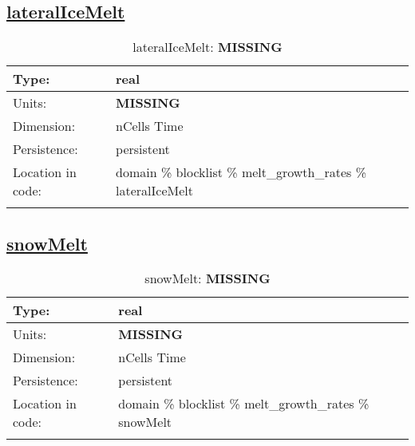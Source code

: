 \subsection[lateralIceMelt]{\hyperref[sec:var_tab_melt_growth_rates]{lateralIceMelt}}
\label{subsec:var_sec_melt_growth_rates_lateralIceMelt}
\begin{center}
\begin{longtable}{| p{2.0in} | p{4.0in} |}
        \hline 
        Type: & real \\
        \hline 
        Units: & {\bf \color{red} MISSING} \\
        \hline 
        Dimension: & nCells Time \\
        \hline 
        Persistence: & persistent \\
        \hline 
         Location in code: & domain \% blocklist \% melt\_growth\_rates \% lateralIceMelt \\
         \hline 
    \caption{lateralIceMelt: {\bf \color{red} MISSING}}
\end{longtable}
\end{center}
\subsection[snowMelt]{\hyperref[sec:var_tab_melt_growth_rates]{snowMelt}}
\label{subsec:var_sec_melt_growth_rates_snowMelt}
\begin{center}
\begin{longtable}{| p{2.0in} | p{4.0in} |}
        \hline 
        Type: & real \\
        \hline 
        Units: & {\bf \color{red} MISSING} \\
        \hline 
        Dimension: & nCells Time \\
        \hline 
        Persistence: & persistent \\
        \hline 
         Location in code: & domain \% blocklist \% melt\_growth\_rates \% snowMelt \\
         \hline 
    \caption{snowMelt: {\bf \color{red} MISSING}}
\end{longtable}
\end{center}
